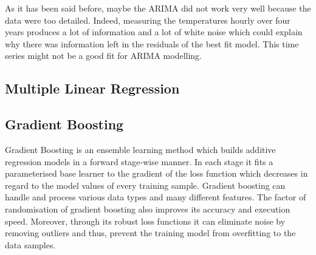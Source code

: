 \documentclass{article} %
\begin{document}
As it has been said before, maybe the ARIMA did not work very well because the data were too detailed. Indeed, measuring the temperatures hourly over four years produces a lot of information and a lot of white noise which could explain why there was information left in the residuals of the best fit model. This time series might not be a good fit for ARIMA modelling.

\subsection*{Multiple Linear Regression}

\subsection*{Gradient Boosting}
Gradient Boosting is an ensemble learning method which builds additive regression models in a forward stage-wise manner. In each stage it fits a parameterised base learner to the gradient of the loss function which decreases in regard to the model values of every training sample. Gradient boosting can handle and process various data types and many different features. The factor of randomisation of gradient boosting also improves its accuracy and execution speed. Moreover, through its robust loss functions it can eliminate noise by removing outliers and thus, prevent the training model from overfitting to the data samples.
\end{document}
